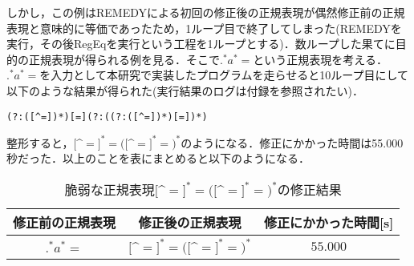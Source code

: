 \documentclass[a4paper, 12pt, dvipdfmx, uplatex]{jsreport}
\begin{document}
しかし，この例はREMEDYによる初回の修正後の正規表現が偶然修正前の正規表現と意味的に等価であったため，1ループ目で終了してしまった(REMEDYを実行，その後RegEqを実行という工程を1ループとする)．数ループした果てに目的の正規表現が得られる例を見る．そこで$.^*a^*\mathrm{=}$という正規表現を考える．$.^*a^*\mathrm{=}$を入力として本研究で実装したプログラムを走らせると10ループ目にして以下のような結果が得られた(実行結果のログは付録を参照されたい)．

\begin{lstlisting}[caption=$.^*a^*\mathrm{=}$を非脆弱化した正規表現,label=number]
(?:([^=])*)[=](?:((?:([^=])*)[=])*)
\end{lstlisting}

整形すると，$[$^$\mathrm{=}]^*\mathrm{=}([$^$\mathrm{=}]^*\mathrm{=})^*$のようになる．修正にかかった時間は55.000秒だった．以上のことを表にまとめると以下のようになる．

\begin{table}[H]
  \centering
  \caption{脆弱な正規表現$[$^$\mathrm{=}]^*\mathrm{=}([$^$\mathrm{=}]^*\mathrm{=})^*$の修正結果\label{vul_res2}}
  \begin{tabular}{c|c|c} \hline \hline
      修正前の正規表現 & 修正後の正規表現  & 修正にかかった時間[s]\\\hline
      $.^*a^*\mathrm{=}$  & $[$^$\mathrm{=}]^*\mathrm{=}([$^$\mathrm{=}]^*\mathrm{=})^*$ &$55.000$ \\\hline
  \end{tabular}
\end{table}








\end{document}
